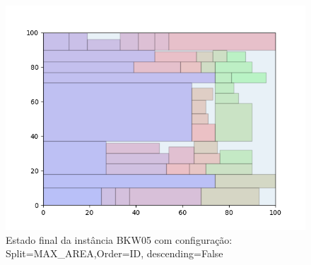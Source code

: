 \begin{figure}[H]
    \centering
    \caption[]{Estado final da instância BKW05 com configuração: Split=MAX_AREA,Order=ID, descending=False}
    \label{fig:bkw05-max_area-id-false}
    \includegraphics[scale=0.5]{output/figures/bkw/bkw05/max_area/id/false/00}
\end{figure}